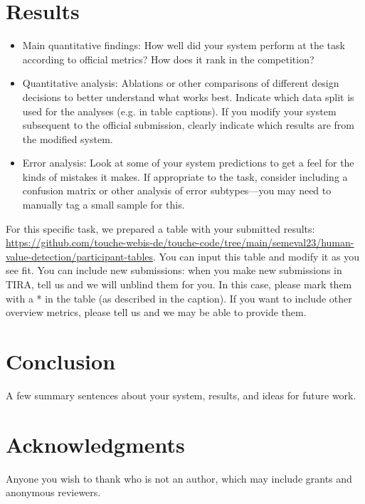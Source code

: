 \documentclass[11pt]{article}
\begin{document}
\section{Results}

\begin{itemize}
	\item Main quantitative findings: How well did your system perform at the task according to official metrics? How does it rank in the competition?
	
	\item Quantitative analysis: Ablations or other comparisons of different design decisions to better understand what works best. Indicate which data split is used for the analyses (e.g. in table captions). If you modify your system subsequent to the official submission, clearly indicate which results are from the modified system.
	
	\item Error analysis: Look at some of your system predictions to get a feel for the kinds of mistakes it makes. If appropriate to the task, consider including a confusion matrix or other analysis of error subtypes—you may need to manually tag a small sample for this.
	
\end{itemize}

For this specific task, we prepared a table with your submitted results: \url{https://github.com/touche-webis-de/touche-code/tree/main/semeval23/human-value-detection/participant-tables}. You can input this table and modify it as you see fit. You can include new submissions: when you make new submissions in TIRA, tell us and we will unblind them for you. In this case, please mark them with a * in the table (as described in the caption). If you want to include other overview metrics, please tell us and we may be able to provide them.

\section{Conclusion}
A few summary sentences about your system, results, and ideas for future work.

\section{Acknowledgments}
Anyone you wish to thank who is not an author, which may include grants and anonymous reviewers.




\end{document}
